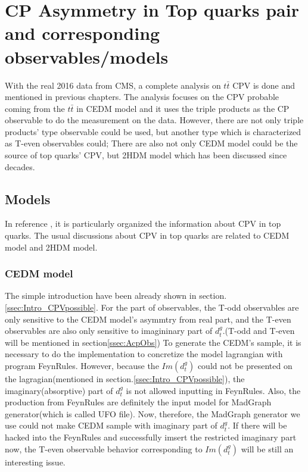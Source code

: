 

\section{CP Asymmetry in Top quarks pair and corresponding observables/models}
\label{sec:AcpModelObs}

	With the real 2016 data from CMS, a complete analysis on $t\bar{t}$ CPV is done and mentioned in previous chapters. The analysis focuses on the CPV probable coming from the $t\bar{t}$ in CEDM model and it uses the triple products as the CP observable to do the measurement on the data. However, there are not only triple products' type observable could be used, but another type which is characterized as T-even observables could; There are also not only CEDM model could be the source of top quarks' CPV, but 2HDM model which has been discussed since decades. 

	\subsection{Models}
	\label{ssec:AcpModel}

		In reference \cite{Atwood:2000tu}, it is particularly organized the information about CPV in top quarks. The usual discussions about CPV in top quarks are related to CEDM model and 2HDM model.

		\subsubsection{ CEDM model}
		\label{sssec:AcpModel_CEDM}

			The simple introduction have been already shown in section.\ref{ssec:Intro_CPVpossible}. For the part of observables, the T-odd observables are only sensitive to the CEDM model's asymmtry from real part, and the T-even observables are also only sensitive to imagininary part of $d_t^g$.(T-odd and T-even will be mentioned in section\ref{ssec:AcpObs}) To generate the CEDM's sample, it is necessary to do the implementation to concretize the model lagrangian with program FeynRules\cite{Christensen:2008py}. However, because the $Im(d_t^g)$ could not be presented on the lagragian(mentioned in section.\ref{ssec:Intro_CPVpossible}), the imaginary(absorptive) part of $d_t^g$ is not allowed inputting in FeynRules. Also, the production from FeynRules are definitely the input model for MadGraph generator(which is called UFO file). Now, therefore, the MadGraph generator we use could not make CEDM sample with imaginary part of $d_t^g$. If there will be hacked into the FeynRules and successfully imsert the restricted imaginary part now, the T-even observable behavior corresponding to $Im(d_t^g)$ will be still an interesting issue.

